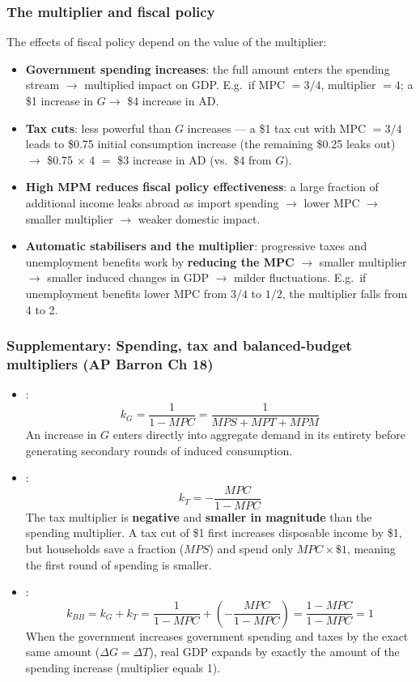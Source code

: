\subsubsection*{The multiplier and fiscal policy}
The effects of fiscal policy depend on the value of the multiplier:
\begin{itemize}
  \item \textbf{Government spending increases}: the full amount enters the spending stream $\to$ multiplied impact on GDP. E.g.\ if MPC $= 3/4$, multiplier $= 4$; a \$1 increase in $G \to$ \$4 increase in AD.
  \item \textbf{Tax cuts}: less powerful than $G$ increases --- a \$1 tax cut with MPC $= 3/4$ leads to \$0.75 initial consumption increase (the remaining \$0.25 leaks out) $\to$ \$0.75 $\times$ 4 $=$ \$3 increase in AD (vs.\ \$4 from $G$).
  \item \textbf{High MPM reduces fiscal policy effectiveness}: a large fraction of additional income leaks abroad as import spending $\to$ lower MPC $\to$ smaller multiplier $\to$ weaker domestic impact.
  \item \textbf{Automatic stabilisers and the multiplier}: progressive taxes and unemployment benefits work by \textbf{reducing the MPC} $\to$ smaller multiplier $\to$ smaller induced changes in GDP $\to$ milder fluctuations. E.g.\ if unemployment benefits lower MPC from $3/4$ to $1/2$, the multiplier falls from 4 to 2.
\end{itemize}

\subsubsection*{Supplementary: Spending, tax and balanced-budget multipliers (AP Barron Ch 18)}
\begin{itemize}
  \item {}:
  \[k_G = \dfrac{1}{1-MPC} = \dfrac{1}{MPS+MPT+MPM}\]
  An increase in $G$ enters directly into aggregate demand in its entirety before generating secondary rounds of induced consumption.
  \item {}:
  \[k_T = -\dfrac{MPC}{1-MPC}\]
  The tax multiplier is \textbf{negative} and \textbf{smaller in magnitude} than the spending multiplier. A tax cut of \$1 first increases disposable income by \$1, but households save a fraction ($MPS$) and spend only $MPC \times \$1$, meaning the first round of spending is smaller.
  \item {}:
  \[k_{BB} = k_G + k_T = \dfrac{1}{1-MPC} + \left(-\dfrac{MPC}{1-MPC}\right) = \dfrac{1-MPC}{1-MPC} = 1\]
  When the government increases government spending and taxes by the exact same amount ($\Delta G = \Delta T$), real GDP expands by exactly the amount of the spending increase (multiplier equals 1).
\end{itemize}

